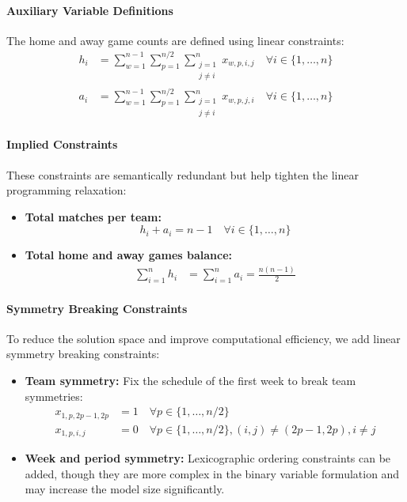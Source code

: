 \documentclass[11pt]{article}
\begin{document}
\paragraph{Auxiliary Variable Definitions}

The home and away game counts are defined using linear constraints:
\begin{align}
h_i &= \sum_{w=1}^{n-1} \sum_{p=1}^{n/2} \sum_{\substack{j=1 \\ j \neq i}}^{n} x_{w,p,i,j} \quad \forall i \in \{1, \ldots, n\} \\
a_i &= \sum_{w=1}^{n-1} \sum_{p=1}^{n/2} \sum_{\substack{j=1 \\ j \neq i}}^{n} x_{w,p,j,i} \quad \forall i \in \{1, \ldots, n\}
\end{align}

\paragraph{Implied Constraints}

These constraints are semantically redundant but help tighten the linear programming relaxation:
\begin{itemize}
    \item \textbf{Total matches per team:}
    \begin{equation}
        h_i + a_i = n - 1 \quad \forall i \in \{1, \ldots, n\}
    \end{equation}

    \item \textbf{Total home and away games balance:}
    \begin{align}
        \sum_{i=1}^{n} h_i &= \sum_{i=1}^{n} a_i = \frac{n(n-1)}{2}
    \end{align}
\end{itemize}

\paragraph{Symmetry Breaking Constraints}

To reduce the solution space and improve computational efficiency, we add linear symmetry breaking constraints:

\begin{itemize}
    \item \textbf{Team symmetry:} Fix the schedule of the first week to break team symmetries:
    \begin{align}
        x_{1,p,2p-1,2p} &= 1 \quad \forall p \in \{1, \ldots, n/2\} \\
        x_{1,p,i,j} &= 0 \quad \forall p \in \{1, \ldots, n/2\}, (i,j) \neq (2p-1, 2p), i \neq j
    \end{align}

    \item \textbf{Week and period symmetry:} Lexicographic ordering constraints can be added, though they are more complex in the binary variable formulation and may increase the model size significantly.
\end{itemize}
\end{document}
